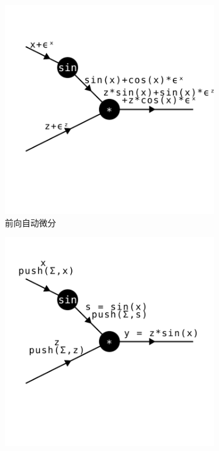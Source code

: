 \documentclass[A4,twoside,fontset=ubuntu,UTF8]{ctexart}
\begin{document}
    \begin{figure}[t]
\centering
\begin{subfigure}[b]{0.32\textwidth}
    \centering
    \includegraphics[width=\textwidth, trim={1cm 3cm 0cm 1cm}, clip]{./forwarddiff.pdf}
    \caption{\small 前向自动微分}
\end{subfigure}
\begin{subfigure}[b]{0.32\textwidth}
    \centering
    \includegraphics[width=\textwidth, trim={0 3cm 1cm 1cm}, clip]{./backward-forward.pdf}

\end{subfigure}
\end{figure}
\end{document}
